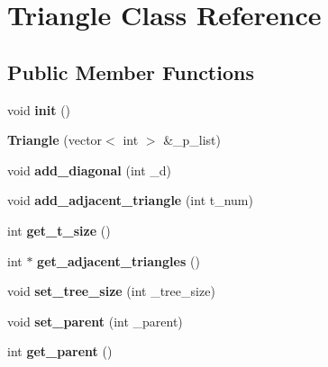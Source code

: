 \hypertarget{class_triangle}{}\section{Triangle Class Reference}
\label{class_triangle}
\subsection*{Public Member Functions}
\begin{DoxyCompactItemize}
\item 
\mbox{\label{class_triangle_a3be9e549de582f54c379e86c2dec6aec}} 
void {\bfseries init} ()
\item 
\mbox{\label{class_triangle_a5ea4488e26163b166a5ea72b737524e8}} 
{\bfseries Triangle} (vector$<$ int $>$ \&\+\_\+p\+\_\+list)
\item 
\mbox{\label{class_triangle_af8d2bd1fb11e81e368997ac2662c2832}} 
void {\bfseries add\+\_\+diagonal} (int \+\_\+d)
\item 
\mbox{\label{class_triangle_a6c940fc714aaea784ac596de0e0852e6}} 
void {\bfseries add\+\_\+adjacent\+\_\+triangle} (int t\+\_\+num)
\item 
\mbox{\label{class_triangle_a0f45f23386b2e60d5e9bdc87a4693274}} 
int {\bfseries get\+\_\+t\+\_\+size} ()
\item 
\mbox{\label{class_triangle_ad41a4c50b14bd51a9db5b80a3ccc0e33}} 
int $\ast$ {\bfseries get\+\_\+adjacent\+\_\+triangles} ()
\item 
\mbox{\label{class_triangle_a5b62cd3321b1204f2f44f280277875e9}} 
void {\bfseries set\+\_\+tree\+\_\+size} (int \+\_\+tree\+\_\+size)
\item 
\mbox{\label{class_triangle_ad6dfbaff1d2e42f51650c71991b7cd04}} 
void {\bfseries set\+\_\+parent} (int \+\_\+parent)
\item 
\mbox{\label{class_triangle_a80669909cb1c9e17d9c2b88ac17a91c1}} 
int {\bfseries get\+\_\+parent} ()
\item 

\end{DoxyCompactItemize}
